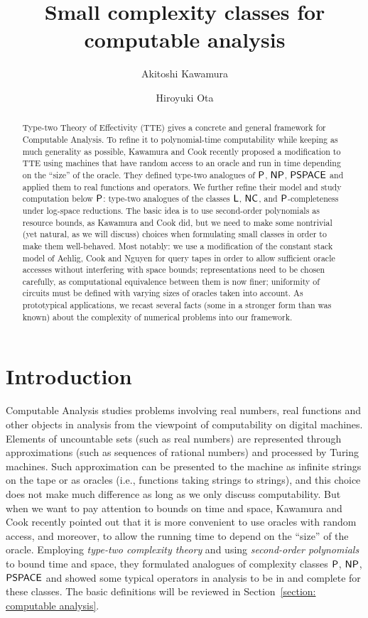 \documentclass[a4paper,UKenglish]{lipics}
\title{Small complexity classes for computable analysis}
\author{Akitoshi Kawamura}
\author{Hiroyuki Ota}
\affil{University of Tokyo}
\begin{document}
\maketitle

\begin{abstract}
Type-two Theory of Effectivity (TTE) gives a concrete and general framework for 
Computable Analysis. 
To refine it to polynomial-time computability 
while keeping as much generality as possible, 
Kawamura and Cook recently proposed a modification to TTE using 
machines that have random access to an oracle and 
run in time depending on the ``size'' of the oracle. 
They defined type-two analogues of 
$\mathsf{P}$, $\mathsf{NP}$, $\mathsf{PSPACE}$ 
and applied them to real functions and operators. 
We further refine their model and study computation below $\mathsf{P}$: 
type-two analogues of 
the classes $\mathsf{L}$, 
$\mathsf{NC}$, 
and $\mathsf{P}$-completeness under log-space reductions.
The basic idea is 
to use second-order polynomials as resource bounds, 
as Kawamura and Cook did, 
but we need to make some nontrivial (yet natural, as we will discuss) choices
when formulating small classes
in order to make them well-behaved. 
Most notably: 
we use a modification of the constant stack model 
of Aehlig, Cook and Nguyen for query tapes 
in order to allow sufficient oracle accesses without interfering with space bounds; 
representations need to be chosen carefully, as 
computational equivalence between them is now finer; 
uniformity of circuits must be defined 
with varying sizes of oracles taken into account. 
As prototypical applications, 
we recast several facts (some in a stronger form than was known) 
about the complexity of numerical problems 
into our framework. 
\end{abstract}

\section{Introduction}

Computable Analysis 
\cite{bhw,ko1991complexity,weihrauch00:_comput_analy}
studies problems 
involving real numbers, real functions and other objects in analysis
from the viewpoint of computability on digital machines. 
Elements of uncountable sets (such as real numbers) are
represented through approximations (such as sequences of rational numbers)
and processed by Turing machines. 
Such approximation can be 
presented to the machine 
as infinite strings on the tape 
or as oracles (i.e., functions taking strings to strings), 
and this choice does not make much difference 
as long as we only discuss computability. 
But when we want to pay attention to bounds on time and space, 
Kawamura and Cook \cite{kawamura2012complexity} recently pointed out that 
it is more convenient to use oracles with random access, 
and moreover, to allow the running time 
to depend on the ``size'' of the oracle. 
Employing \emph{type-two complexity theory} and 
using \emph{second-order polynomials} to bound time and space, 
they formulated analogues of complexity classes 
$\mathsf{P}$, $\mathsf{NP}$, $\mathsf{PSPACE}$ and 
showed some typical operators in analysis
to be in and complete for these classes. 
The basic definitions will be reviewed in Section~\ref{section: computable analysis}. 
\end{document}
